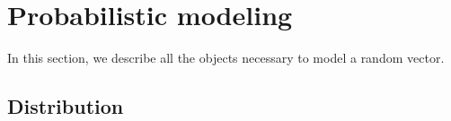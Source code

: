 
\newpage
{}
\section{Probabilistic modeling}

In this section, we describe all the objects necessary to model a random vector.

\subsection{Distribution}


